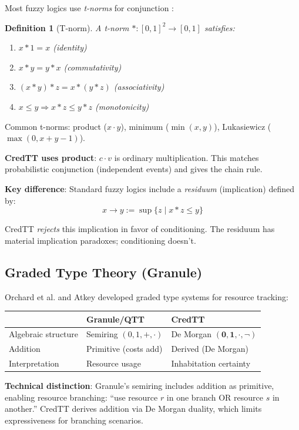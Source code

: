 \documentclass[11pt,a4paper]{article}
\newtheorem{definition}{Definition}[section]
\newcommand{\one}{\mathbf{1}}
\newcommand{\zero}{\mathbf{0}}
\newcommand{\negc}{\neg}
\begin{document}
Most fuzzy logics use \emph{t-norms} for conjunction \citep{klement2000triangular}:

\begin{definition}[T-norm]
A t-norm $* : [0,1]^2 \to [0,1]$ satisfies:
\begin{enumerate}
    \item $x * 1 = x$ (identity)
    \item $x * y = y * x$ (commutativity)
    \item $(x * y) * z = x * (y * z)$ (associativity)
    \item $x \leq y \Rightarrow x * z \leq y * z$ (monotonicity)
\end{enumerate}
\end{definition}

Common t-norms: product ($x \cdot y$), minimum ($\min(x,y)$), Lukasiewicz ($\max(0, x+y-1)$).

\textbf{CredTT uses product}: $c \cdot v$ is ordinary multiplication. This matches probabilistic conjunction (independent events) and gives the chain rule.

\textbf{Key difference}: Standard fuzzy logics include a \emph{residuum} (implication) defined by:
\[
x \to y := \sup\{z \mid x * z \leq y\}
\]

CredTT \emph{rejects} this implication in favor of conditioning. The residuum has material implication paradoxes; conditioning doesn't.

\subsection{Graded Type Theory (Granule)}

Orchard et al. \citep{orchard2019quantitative} and Atkey \citep{atkey2018syntax} developed graded type systems for resource tracking:

\begin{center}
\begin{tabular}{l|l|l}
& \textbf{Granule/QTT} & \textbf{CredTT} \\
\hline
Algebraic structure & Semiring $(0,1,+,\cdot)$ & De Morgan $(\zero,\one,\cdot,\negc)$ \\
Addition & Primitive (costs add) & Derived (De Morgan) \\
Interpretation & Resource usage & Inhabitation certainty \\
\end{tabular}
\end{center}

\textbf{Technical distinction}: Granule's semiring includes addition as primitive, enabling resource branching: ``use resource $r$ in one branch OR resource $s$ in another.'' CredTT derives addition via De Morgan duality, which limits expressiveness for branching scenarios.
\end{document}
